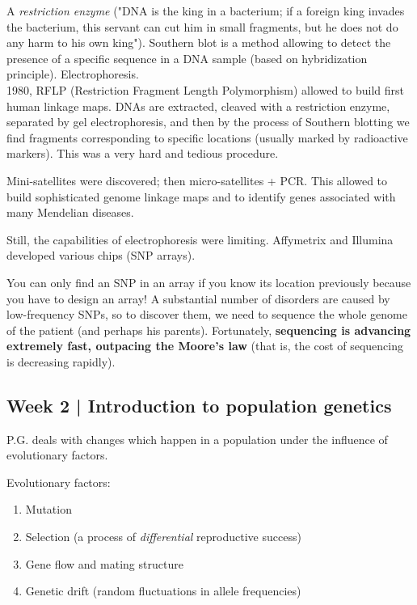 \documentclass[main.tex]{subfiles}
\begin{document}
A \emph{restriction enzyme} ("DNA is the king in a bacterium; if a foreign king invades the bacterium, this servant can cut him in small fragments, but he does not do any harm to his own king").
Southern blot is a method allowing to detect the presence of a specific sequence in a DNA sample (based on hybridization principle).
Electrophoresis. \\

1980, RFLP (Restriction Fragment Length Polymorphism) allowed to build first human linkage maps. %
DNAs are extracted, cleaved with a restriction enzyme, separated by gel electrophoresis, and then by the process of Southern blotting we find fragments corresponding to specific locations (usually marked by radioactive markers).
This was a very hard and tedious procedure.

Mini-satellites were discovered; then micro-satellites + PCR.
This allowed to build sophisticated genome linkage maps and to identify genes associated with many Mendelian diseases.

Still, the capabilities of electrophoresis were limiting. Affymetrix and Illumina developed various chips (SNP arrays).

You can only find an SNP in an array if you know its location previously because you have to design an array!
A substantial number of disorders are caused by low-frequency SNPs, so to discover them, we need to sequence the whole genome of the patient (and perhaps his parents).
Fortunately, \textbf{sequencing is advancing extremely fast, outpacing the Moore's law} (that is, the cost of sequencing is decreasing rapidly).

\subsection{Week 2 | Introduction to population genetics }

P.G. deals with changes which happen in a population under the influence of evolutionary factors.

Evolutionary factors:
\begin{enumerate}[noitemsep]
    \item Mutation
    \item Selection (a process of \emph{differential} reproductive success)
    \item Gene flow and mating structure
    \item Genetic drift (random fluctuations in allele frequencies)
\end{enumerate}
\end{document}
